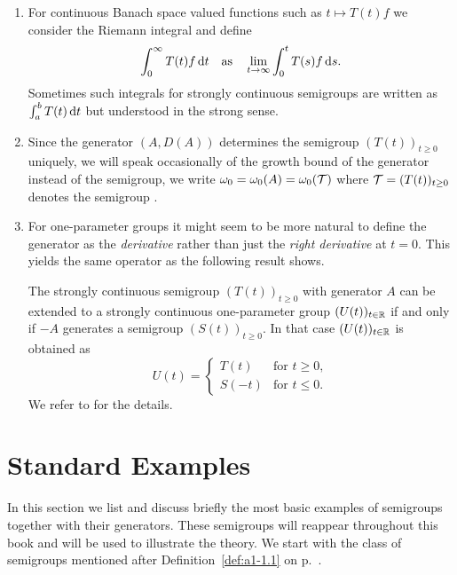\begin{remarks}\label{rem:a1-1.12}
\begin{enumerate}[\upshape(i), wide, labelindent=.5em]
\item 
For continuous Banach space valued functions such as $t \mapsto T(t)f$ we consider the Riemann integral and define 
\[
	\int_{0}^{\infty}T(t)f  \mathop{}\!\mathrm{d}{t} 
		\quad \text{as} \quad
	\lim_{t \to \infty}\int_{0}^{t}T(s)f  \mathop{}\!\mathrm{d}{s} .
\]
Sometimes such integrals for strongly continuous semigroups are written as $\int_{a}^{b}T(t) \mathop{}\!\mathrm{d}{t}$ but understood in the strong sense.

\item 
Since the generator $(A,D(A))$ determines the semigroup $(T(t))_{t \geq 0}$ uniquely, we will speak occasionally of the growth bound of the generator instead of the semigroup, \ie we write $\omega_{0} = \omega_{0}(A) = \omega_{0}(\mathcal{T})$ where $\mathcal{T} = (T(t))_{t \geq 0}$ denotes the semigroup .

\item 
For one-parameter groups it might seem to be more natural to define the generator as the \emph{derivative} rather than just the \emph{right derivative} at $t = 0$.
This yields the same operator as the following result shows.

The strongly continuous semigroup $(T(t))_{t \geq 0}$ with generator $A$ can be extended to a strongly continuous one-parameter group $(U(t))_{t \in \mathbb{R}}$ if and only if $-A$ generates a semigroup $(S(t))_{t \geq 0}$.
In that case $(U(t))_{t \in \mathbb{R}}$ is obtained as
\[
    U(t) = \begin{cases}
        T(t) & \text{for } t \geq 0 ,\\
        S(-t) & \text{for } t \leq 0 .
    \end{cases}
\]
We refer to \citet[Proposition~1.14]{davies:1980} for the details.

\end{enumerate}
\end{remarks}
\section{Standard Examples}\label{sec:a1-2}%
In this section we list and discuss briefly the most basic examples of semigroups together with their generators.
These semigroups will reappear throughout this book and will be used to illustrate the theory.
We start with the class of semigroups mentioned after Definition~\ref{def:a1-1.1} on p.~\pageref{def:a1-1.1}.
